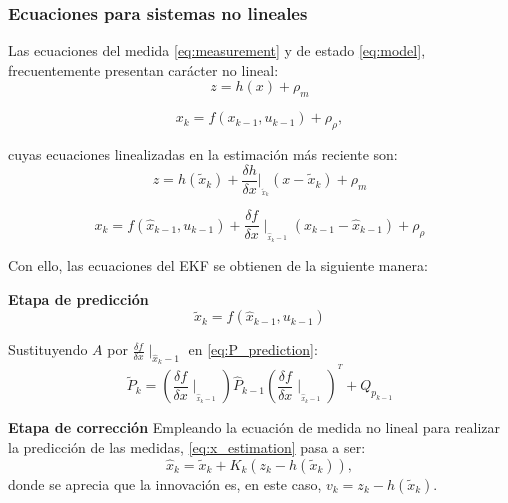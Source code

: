 \subsubsection{Ecuaciones para sistemas no lineales}
Las ecuaciones del medida \ref{eq:measurement} y de estado \ref{eq:model}, frecuentemente presentan carácter no lineal:
\begin{equation}\label{eq:medida_nolineal}
    z = h(x)+\rho_{m}
\end{equation}

\begin{equation}\label{eq:estado_nolineal}
    x_{k} = f(x_{k-1},u_{k-1})+\rho_{\rho},
\end{equation}

cuyas ecuaciones linealizadas en la estimación más reciente son:
\begin{equation}\label{eq:medida_linealizada}
    z = h(\tilde{x}_{k})+\frac{\delta h}{\delta x}|_{ _{\tilde{x}_k}} (x-\tilde{x}_{k})+\rho_{m}
\end{equation}

\begin{equation}\label{eq:estado_linealizada}
    x_{k} = f(\hat{x}_{k-1},u_{k-1})+\frac{\delta f}{\delta x}\mid _{_{\hat{x}_k-1}} (x_{k-1}-\hat{x}_{k-1})+\rho_{\rho}
\end{equation}

Con ello, las ecuaciones del EKF se obtienen de la siguiente manera:


\textbf{Etapa de predicción}
\begin{equation}\label{eq:x_predictionEKF}
    \tilde{x}_{k} = f(\hat{x}_{k-1},u_{k-1})
\end{equation}

Sustituyendo $A$ por $\frac{\delta f}{\delta x}\mid _{\hat{x}_k-1}$ en \ref{eq:P_prediction}:
\begin{equation}\label{eq:P_predictionEKF}
    \tilde{P}_{k} = (\frac{\delta f}{\delta x}\mid_{ _{\hat{x}_k-1}}) \hat{P}_{k-1} (\frac{\delta f}{\delta x}\mid_{ _{\hat{x}_k-1}})^{^{T}}+Q_{p_{k-1}}
\end{equation}


\textbf{Etapa de corrección}
Empleando la ecuación de medida no lineal para realizar la predicción de las medidas, \ref{eq:x_estimation} pasa a ser:
\begin{equation}\label{eq:x_estimationEKF}
    \hat{x}_{k} = \tilde{x}_{k}+K_{k}(z_{k}-h(\tilde{x}_{k})),
\end{equation}
donde se aprecia que la innovación es, en este caso, $v_{k} = z_{k}-h(\tilde{x}_{k})$.

